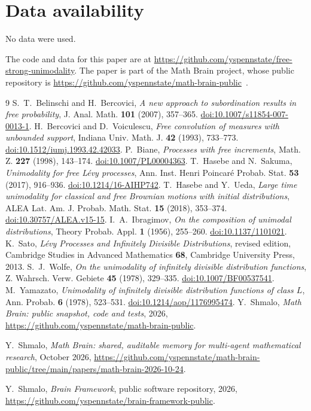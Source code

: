 \documentclass[11pt]{amsart}
\numberwithin{equation}{section}
\theoremstyle{definition}
\theoremstyle{remark}
\begin{document}
\section*{Data availability}
No data were used.

The code and data for this paper are at \url{https://github.com/yspennstate/free-strong-unimodality}. The paper is part of the Math Brain project, whose public repository is \url{https://github.com/yspennstate/math-brain-public}~\cite{MathBrainRepo}.

\begin{thebibliography}{9}
S.~T.~Belinschi and H.~Bercovici, \emph{A new approach to subordination results in free probability}, J. Anal. Math. \textbf{101} (2007), 357--365. \href{https://doi.org/10.1007/s11854-007-0013-1}{doi:10.1007/s11854-007-0013-1}.
H.~Bercovici and D.~Voiculescu, \emph{Free convolution of measures with unbounded support}, Indiana Univ. Math. J. \textbf{42} (1993), 733--773. \href{https://doi.org/10.1512/iumj.1993.42.42033}{doi:10.1512/iumj.1993.42.42033}.
P.~Biane, \emph{Processes with free increments}, Math. Z. \textbf{227} (1998), 143--174. \href{https://doi.org/10.1007/PL00004363}{doi:10.1007/PL00004363}.
T.~Hasebe and N.~Sakuma, \emph{Unimodality for free L\'evy processes}, Ann. Inst. Henri Poincar\'e Probab. Stat. \textbf{53} (2017), 916--936. \href{https://doi.org/10.1214/16-AIHP742}{doi:10.1214/16-AIHP742}.
T.~Hasebe and Y.~Ueda, \emph{Large time unimodality for classical and free Brownian motions with initial distributions}, ALEA Lat. Am. J. Probab. Math. Stat. \textbf{15} (2018), 353--374. \href{https://doi.org/10.30757/ALEA.v15-15}{doi:10.30757/ALEA.v15-15}.
I.~A.~Ibragimov, \emph{On the composition of unimodal distributions}, Theory Probab. Appl. \textbf{1} (1956), 255--260. \href{https://doi.org/10.1137/1101021}{doi:10.1137/1101021}.
K.~Sato, \emph{L\'evy Processes and Infinitely Divisible Distributions}, revised edition, Cambridge Studies in Advanced Mathematics \textbf{68}, Cambridge University Press, 2013.
S.~J.~Wolfe, \emph{On the unimodality of infinitely divisible distribution functions}, Z. Wahrsch. Verw. Gebiete \textbf{45} (1978), 329--335. \href{https://doi.org/10.1007/BF00537541}{doi:10.1007/BF00537541}.
M.~Yamazato, \emph{Unimodality of infinitely divisible distribution functions of class $L$}, Ann. Probab. \textbf{6} (1978), 523--531. \href{https://doi.org/10.1214/aop/1176995474}{doi:10.1214/aop/1176995474}.
 Y.~Shmalo, \emph{Math Brain: public snapshot, code and tests}, 2026, \url{https://github.com/yspennstate/math-brain-public}.

 Y.~Shmalo, \emph{Math Brain: shared, auditable memory for multi-agent mathematical research}, October 2026, \url{https://github.com/yspennstate/math-brain-public/tree/main/papers/math-brain-2026-10-24}.

 Y.~Shmalo, \emph{Brain Framework}, public software repository, 2026, \url{https://github.com/yspennstate/brain-framework-public}.

\end{thebibliography}
\end{document}
